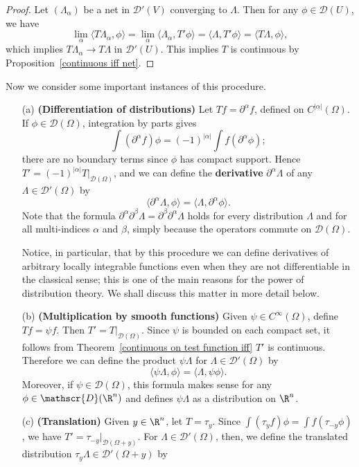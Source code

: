 \begin{proof}
Let $(\Lambda_\alpha)$ be a net in $\mathscr{D}'(V)$ converging to $\Lambda$. Then for any $\phi\in\mathscr{D}(U)$, we have
\[\lim_\alpha\langle T\Lambda_\alpha,\phi\rangle=\lim_\alpha\langle \Lambda_\alpha,T'\phi\rangle=\langle \Lambda,T'\phi\rangle=\langle T\Lambda,\phi\rangle,\]
which implies $T\Lambda_\alpha\to T\Lambda$ in $\mathscr{D}'(U)$. This implies $T$ is continuous by Proposition~\ref{continuous iff net}.
\end{proof}
Now we consider some important instances of this procedure.
\begin{example}
\mbox{}
\begin{itemize}
\item[(a)] \textbf{(Differentiation of distributions)} Let $Tf=\partial^\alpha f$, defined on $C^{|\alpha|}(\Omega)$. If $\phi\in\mathscr{D}(\Omega)$, integration by parts gives
\[\int(\partial^\alpha f)\phi=(-1)^{|\alpha|}\int f(\partial^\alpha\phi);\]
there are no boundary terms since $\phi$ has compact support. Hence $T'=(-1)^{|\alpha|}T|_{\mathscr{D}(\Omega)}$, and we can define the \textbf{derivative} $\partial^\alpha\Lambda$ of any $\Lambda\in\mathscr{D}'(\Omega)$ by
\[\langle\partial^\alpha\Lambda,\phi\rangle=\langle\Lambda,\partial^\alpha\phi\rangle.\]
Note that the formula $\partial^\alpha\partial^\beta\Lambda=\partial^\beta\partial^\alpha\Lambda$ holds for every distribution $\Lambda$ and for all multi-indices $\alpha$ and $\beta$, simply because the operators commute on $\mathscr{D}(\Omega)$.\par
Notice, in particular, that by this procedure we can define derivatives of arbitrary locally integrable functions even when they are not differentiable in the classical sense; this is one of the main reasons for the power of distribution theory. We shall discuss this matter in more detail below.
\item[(b)] \textbf{(Multiplication by smooth functions)} Given $\psi\in C^\infty(\Omega)$, define $Tf=\psi f$. Then $T'=T|_{\mathscr{D}(\Omega)}$. Since $\psi$ is bounded on each compact set, it follows from Theorem~\ref{continuous on test function iff} $T'$ is continuous. Therefore we can define the product $\psi\Lambda$ for $\Lambda\in\mathscr{D}'(\Omega)$ by
\[\langle\psi\Lambda,\phi\rangle=\langle\Lambda,\psi\phi\rangle.\]
Moreover, if $\psi\in\mathscr{D}(\Omega)$, this formula makes sense for any $\phi\in\mathscr{D}(\R^n)$ and defines $\psi\Lambda$ as a distribution on $\R^n$. 
\item[(c)] \textbf{(Translation)} Given $y\in\R^n$, let $T=\tau_y$. Since $\int(\tau_yf)\phi=\int f(\tau_{-y}\phi)$, we have $T'=\tau_{-y}|_{\mathscr{D}(\Omega+y)}$. For $\Lambda\in\mathscr{D}'(\Omega)$, then, we define the translated distribution $\tau_y\Lambda\in\mathscr{D}'(\Omega+y)$ by

\end{itemize}
\end{example}
